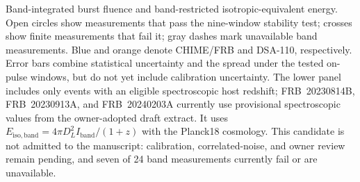 Band-integrated burst fluence and band-restricted isotropic-equivalent
energy. Open circles show measurements that pass the nine-window stability
test; crosses show finite measurements that fail it; gray dashes mark
unavailable band measurements. Blue and orange denote CHIME/FRB and DSA-110,
respectively. Error bars combine statistical uncertainty and the spread under
the tested on-pulse windows, but do not yet include calibration uncertainty.
The lower panel includes only events with an eligible spectroscopic host
redshift; FRB~20230814B, FRB~20230913A, and FRB~20240203A currently use
provisional spectroscopic values from the owner-adopted draft extract. It uses
$E_{\mathrm{iso,band}}=4\pi D_L^2 I_{\mathrm{band}}/(1+z)$ with the Planck18
cosmology. This candidate is not admitted to the manuscript: calibration,
correlated-noise, and owner review remain pending, and seven of 24 band
measurements currently fail or are unavailable.
